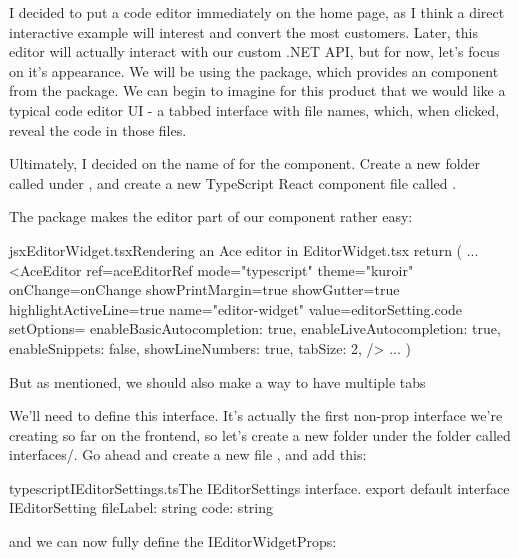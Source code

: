 \documentclass[paper=6in:9in,pagesize=pdftex,headinclude=on,footinclude=on,12pt]{scrbook}
\begin{document}

I decided to put a code editor immediately on the home page, as I think a direct interactive example will interest and convert the most customers. Later, this editor will actually interact with our custom .NET API, but for now, let's focus on it's appearance. We will be using the  package, which provides an  component from the  package. We can begin to imagine for this product that we would like a typical code editor UI - a tabbed interface with file names, which, when clicked, reveal the code in those files.

Ultimately, I decided on the name of  for the component. Create a new folder called  under , and create a new TypeScript React component file called .

The  package makes the editor part of our component rather easy:

\begin{codeInput}{jsx}{EditorWidget.tsx}{Rendering an Ace editor in EditorWidget.tsx}
return (
  ...
  <AceEditor
    ref={aceEditorRef}
    mode="typescript"
    theme="kuroir"
    onChange={onChange}
    showPrintMargin={true}
    showGutter={true}
    highlightActiveLine={true}
    name="editor-widget"
    value={editorSetting.code}
    setOptions={{
      enableBasicAutocompletion: true,
      enableLiveAutocompletion: true,
      enableSnippets: false,
      showLineNumbers: true,
      tabSize: 2,
    }}
  />
  ...
)
\end{codeInput}

But as mentioned, we should also make a way to have multiple tabs

We'll need to define this  interface. It's actually the first non-prop interface we're creating so far on the frontend, so let's create a new folder under the  folder called {interfaces/}. Go ahead and create a new file , and add this:

\begin{codeInput}{typescript}{IEditorSettings.ts}{The IEditorSettings interface.}
export default interface IEditorSetting {
  fileLabel: string
  code: string
}  
\end{codeInput}

and we can now fully define the IEditorWidgetProps:
\end{document}
